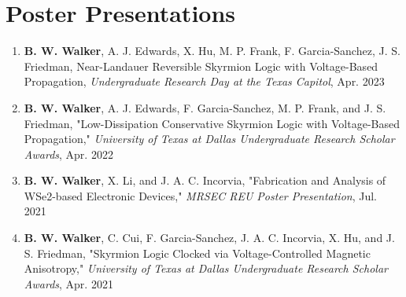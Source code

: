 \documentclass[letterpaper,11pt]{article}
\begin{document}
\section{Poster Presentations}
    \begin{itemize}[leftmargin=0.15in, label={}]
        \small{\item{
        \begin{enumerate}[leftmargin=0.15in]
          \item \small{\textbf{B. W. Walker}, A. J. Edwards, X. Hu, M. P. Frank, F. Garcia-Sanchez, J. S. Friedman, Near-Landauer Reversible Skyrmion Logic with Voltage-Based Propagation, \textit{Undergraduate Research Day at the Texas Capitol}, Apr. 2023}
          \item \small{\textbf{B. W. Walker}, A. J. Edwards, F. Garcia-Sanchez, M. P. Frank, and J. S. Friedman, "Low-Dissipation Conservative Skyrmion Logic with Voltage-Based Propagation," \textit{University of Texas at Dallas Undergraduate Research Scholar Awards}, Apr. 2022}
          \item \small{\textbf{B. W. Walker}, X. Li, and J. A. C. Incorvia, "Fabrication and Analysis of WSe2-based Electronic Devices," \textit{MRSEC REU Poster Presentation}, Jul. 2021}
          \item \small{\textbf{B. W. Walker}, C. Cui, F. Garcia-Sanchez, J. A. C. Incorvia, X. Hu, and J. S. Friedman, "Skyrmion Logic Clocked via Voltage-Controlled Magnetic Anisotropy," \textit{University of Texas at Dallas Undergraduate Research Scholar Awards}, Apr. 2021}
        \end{enumerate}
        }}\vspace{-5pt}
     \end{itemize}
\end{document}
